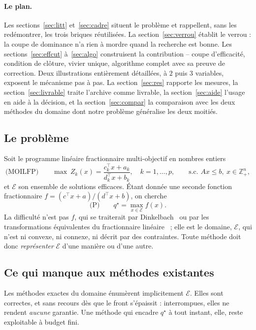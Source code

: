 \documentclass[11pt,a4paper]{article}
\theoremstyle{plain}
\theoremstyle{remark}
\newcommand{\Zk}{Z_k}
\newcommand{\Ecal}{\mathcal{E}}
\newcommand{\qs}{q^{\star}}
\begin{document}
\paragraph{Le plan.} Les sections~\ref{sec:litt} et~\ref{sec:cadre}
situent le problème et rappellent, sans les redémontrer, les trois briques
réutilisées. La section~\ref{sec:verrou} établit le verrou : la coupe de
dominance n'a rien à mordre quand la recherche est bonne. Les
sections~\ref{sec:effcut} à~\ref{sec:algo} construisent la contribution --
coupe d'efficacité, condition de clôture, vivier unique, algorithme complet
avec sa preuve de correction. Deux illustrations entièrement détaillées, à
$2$ puis $3$ variables, exposent le mécanisme pas à pas. La
section~\ref{sec:res} rapporte les mesures, la section~\ref{sec:livrable}
traite l'archive comme livrable, la section~\ref{sec:aide} l'usage en aide
à la décision, et la section~\ref{sec:compar} la comparaison avec les deux
méthodes du domaine dont notre problème généralise les deux moitiés.

\subsection{Le problème}

Soit le programme linéaire fractionnaire multi-objectif en nombres entiers
\[
  \text{(MOILFP)}\qquad
  \max\ \Zk(x)=\frac{c_k^{\top}x+a_k}{d_k^{\top}x+b_k},\quad k=1,\dots,p,
  \qquad \text{s.c. } Ax\le b,\ x\in\mathbb{Z}^n_+ ,
\]
et $\Ecal$ son ensemble de solutions efficaces. Étant donnée une seconde
fonction fractionnaire $f=(c^{\top}x+a)/(d^{\top}x+b)$, on cherche
\[
  \text{(P)}\qquad \qs=\max_{x\in\Ecal} f(x).
\]
La difficulté n'est pas $f$, qui se traiterait par
Dinkelbach~\cite{dinkelbach1967} ou par les transformations équivalentes du
fractionnaire linéaire~\cite{cambini1992} ; elle est le
domaine, $\Ecal$, qui n'est ni convexe, ni connexe, ni décrit par des
contraintes. Toute méthode doit donc \emph{représenter} $\Ecal$ d'une
manière ou d'une autre.

\subsection{Ce qui manque aux méthodes existantes}

Les méthodes exactes du domaine énumèrent implicitement $\Ecal$. Elles sont
correctes, et sans recours dès que le front s'épaissit : interrompues, elles
ne rendent \emph{aucune} garantie. Une méthode qui encadre $\qs$ à tout
instant, elle, reste exploitable à budget fini.
\end{document}
